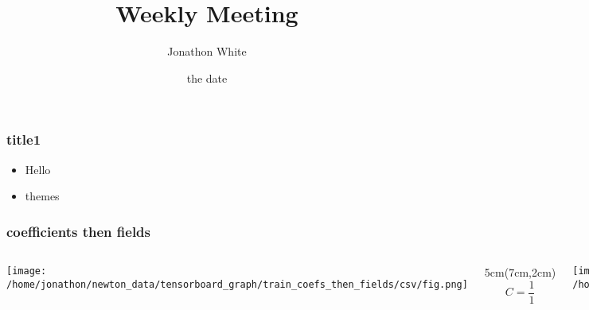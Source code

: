 \documentclass{beamer}
\title{Weekly Meeting}
\author{Jonathon White}
\date{the date}
\begin{document}
\maketitle

\begin{frame}
\frametitle{title1}
	\begin{itemize}
	\item Hello\pause
	\item themes
	\end{itemize}
\end{frame}

\begin{frame}
\frametitle{coefficients then fields}
\begin{columns}
\texttt{[image: /home/jonathon/newton\_data/tensorboard\_graph/train\_coefs\_then\_fields/csv/fig.png]}

\begin{textblock*}{5cm}(7cm,2cm)
\begin{equation*}
C = \frac{1}{1}
\end{equation*}
\end{textblock*}


\texttt{[image: /home/jonathon/newton\_data/retrieval/train\_coefs\_then\_fieldsmeasured\_retrieval\_while\_training/100.png]}
\end{columns}
\end{frame}
\end{document}
